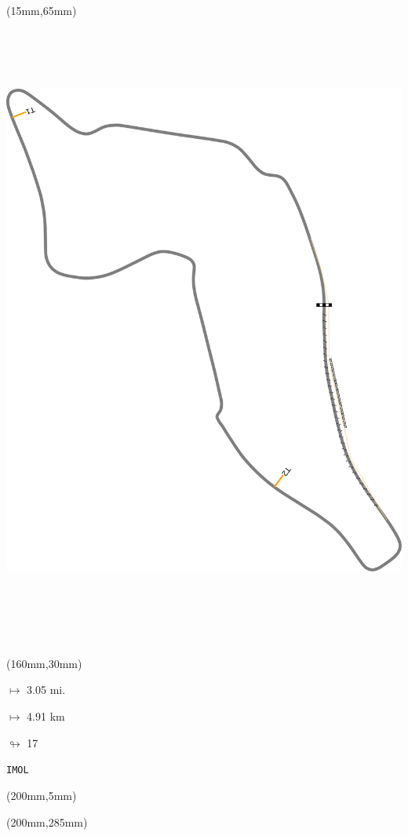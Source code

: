 \begin{textblock*}{185mm}(15mm,65mm)%
\centering
\mbox{\includegraphics[width=185mm,height=210mm,keepaspectratio]{PT/IMOL.pdf}}
\end{textblock*}
\begin{textblock*}{40mm}(160mm,30mm)%
\Large
\par$\mapsto$ 3.05 mi.
\par$\mapsto$ 4.91 km
\par$\looparrowright$ 17
\par\hfill\tiny\tt IMOL\\
\end{textblock*}
\begin{textblock*}{20mm}(200mm,5mm)%
\fbox{\thepage}
\label{IMOL}
\end{textblock*}
\begin{textblock*}{20mm}(200mm,285mm)%
\fbox{\thepage}
\end{textblock*}

